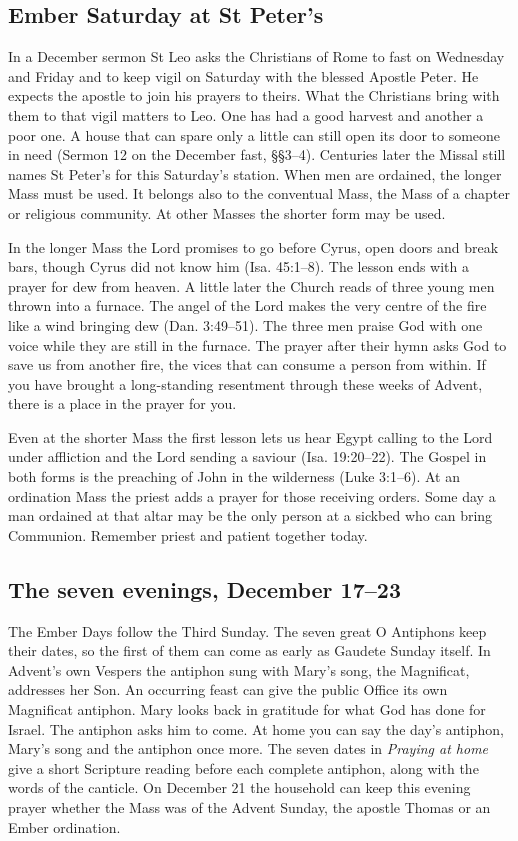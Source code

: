 \subsection{Ember Saturday at St Peter's}

In a December sermon St Leo asks the Christians of Rome to fast on
Wednesday and Friday and to keep vigil on Saturday with the blessed
Apostle Peter. He expects the apostle to join his prayers to theirs.
What the Christians bring with them to that vigil matters to Leo. One
has had a good harvest and another a poor one. A house that can spare
only a little can still open its door to someone in need (Sermon 12
on the December fast, §§3--4). Centuries later the Missal still names
St Peter's for this Saturday's station. When men are ordained, the
longer Mass must be used. It belongs also to the conventual Mass,
the Mass of a chapter or religious community. At other Masses the
shorter form may be used.

In the longer Mass the Lord promises to go before Cyrus, open doors
and break bars, though Cyrus did not know him (Isa. 45:1--8). The
lesson ends with a prayer for dew from heaven. A little later the
Church reads of three young men thrown into a furnace. The angel of
the Lord makes the very centre of the fire like a wind bringing dew
(Dan. 3:49--51). The three men praise God with one voice while they
are still in the furnace. The prayer after their hymn asks God to save
us from another fire, the vices that can consume a person from within.
If you have brought a long-standing resentment through these weeks of
Advent, there is a place in the prayer for you.

Even at the shorter Mass the first lesson lets us hear Egypt calling
to the Lord under affliction and the Lord sending a saviour
(Isa. 19:20--22). The Gospel in both forms is the preaching of John
in the wilderness (Luke 3:1--6). At an ordination Mass the priest
adds a prayer for those receiving orders. Some day a man ordained
at that altar may be the only person at a sickbed who can bring
Communion. Remember priest and patient together today.

\subsection{The seven evenings, December 17--23}

The Ember Days follow the Third Sunday. The seven great O Antiphons
keep their dates, so the first of them can come as early as Gaudete
Sunday itself. In Advent's own Vespers the antiphon sung with
Mary's song, the Magnificat, addresses her Son. An occurring feast
can give the public Office its own Magnificat antiphon.
Mary looks back in gratitude for what God has done for Israel. The
antiphon asks him to come. At home you can say the day's antiphon,
Mary's song and the antiphon once more. The seven dates in \emph{Praying at home}
give a short Scripture reading before each complete antiphon, along
with the words of the canticle. On December 21 the household can keep
this evening prayer whether the Mass was of the Advent Sunday, the
apostle Thomas or an Ember ordination.

